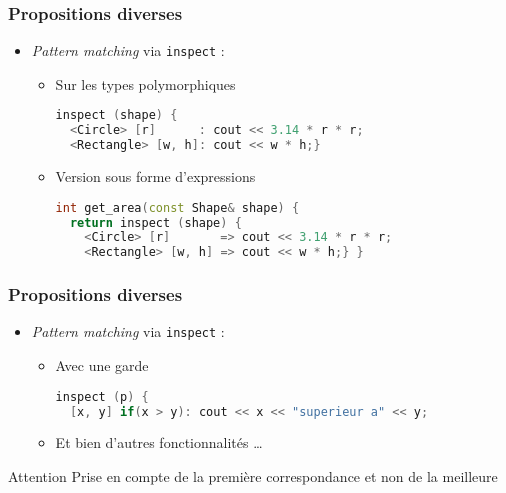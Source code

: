 \documentclass[C++.tex]{subfiles}
\begin{document}
\begin{frame}[fragile]
	\frametitle{Propositions diverses}
	\begin{itemize}
		\item \textit{Pattern matching} via \lstinline|inspect| :
		\begin{itemize}
			\item Sur les types polymorphiques

			\begin{lstlisting}[language=C++]
inspect (shape) {
  <Circle> [r]      : cout << 3.14 * r * r;
  <Rectangle> [w, h]: cout << w * h;}\end{lstlisting}


			\item Version sous forme d'expressions


			\begin{lstlisting}[language=C++]
int get_area(const Shape& shape) {
  return inspect (shape) {
    <Circle> [r]       => cout << 3.14 * r * r;
    <Rectangle> [w, h] => cout << w * h;} }\end{lstlisting}
		\end{itemize}
	\end{itemize}
\end{frame}

\begin{frame}[fragile]
	\frametitle{Propositions diverses}
	\begin{itemize}
		\item \textit{Pattern matching} via \lstinline|inspect| :
		\begin{itemize}
			\item Avec une garde

			\begin{lstlisting}[language=C++]
inspect (p) {
  [x, y] if(x > y): cout << x << "superieur a" << y;\end{lstlisting}

			\item Et bien d'autres fonctionnalités \ldots
		\end{itemize}
	\end{itemize}

	\begin{alertblock}{Attention}
		Prise en compte de la première correspondance et non de la meilleure

	\end{alertblock}
\end{frame}
\end{document}
